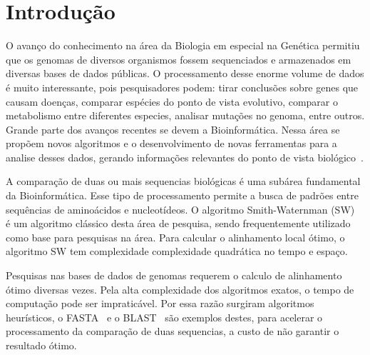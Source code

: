 \documentclass[12pt, a4paper]{article}
\numberwithin{table}{section}
\begin{document}
\section{Introdução}
\label{sec:introducao}



O avanço do conhecimento na área da Biologia em especial na Genética permitiu que
os genomas de diversos organismos fossem sequenciados e armazenados em diversas 
bases de dados públicas. O processamento desse enorme volume de 
dados é muito interessante, pois pesquisadores podem: tirar conclusões sobre 
genes que causam doenças, comparar espécies do ponto de vista evolutivo, comparar 
o metabolismo entre diferentes especies, analisar mutações no genoma, entre 
outros. Grande parte dos avanços recentes se devem a Bioinformática. Nessa área se 
propõem novos algoritmos e o desenvolvimento de novas ferramentas para a analise
desses dados, gerando informações relevantes do ponto de vista 
biológico~\cite{Luscombe2001WhatIB}.

A comparação de duas ou mais sequencias biológicas é uma subárea fundamental
da Bioinformática. Esse tipo de processamento permite a busca de padrões 
entre sequências de aminoácidos e nucleotídeos. O algoritmo
Smith-Waternman (SW)~\cite{SMITH1981195} é um algoritmo clássico desta área 
de pesquisa, sendo frequentemente utilizado como base para 
pesquisas na área. Para  calcular o alinhamento local ótimo,
o algoritmo SW tem complexidade complexidade quadrática no tempo e espaço.

Pesquisas nas bases de dados de genomas requerem o calculo de alinhamento ótimo 
diversas vezes. Pela alta complexidade dos algoritmos exatos, o tempo de 
computação pode ser impraticável. Por essa razão surgiram algoritmos heurísticos, 
o FASTA~\cite{PMID:3162770} e o BLAST~\cite{ALTSCHUL1990403} são exemplos destes, 
para acelerar o processamento da comparação de duas sequencias, a custo de não 
garantir o resultado ótimo. 
\end{document}
